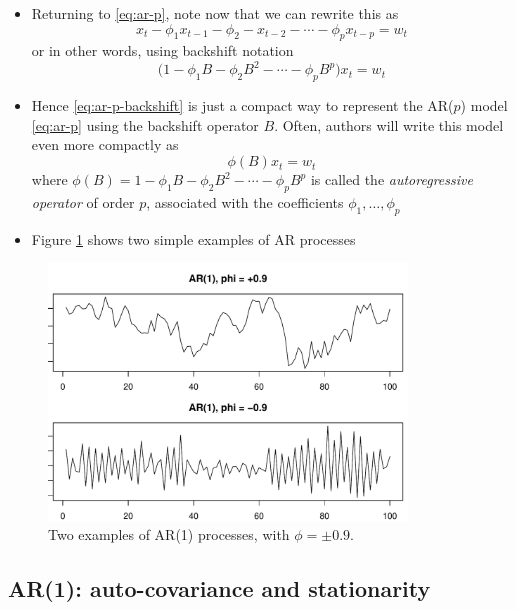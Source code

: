 \documentclass{article}
\begin{document}
\begin{itemize}
\item Returning to \eqref{eq:ar-p}, note now that we can rewrite this as 
  \[
  x_t - \phi_1 x_{t-1} - \phi_2 - x_{t-2} - \cdots - \phi_p x_{t-p} = w_t  
  \]
  or in other words, using backshift notation 
  \begin{equation}
  \label{eq:ar-p-backshift}
  \Big(1 - \phi_1 B - \phi_2 B^2 - \cdots - \phi_p B^p \Big) x_t = w_t 
  \end{equation}

\item Hence \eqref{eq:ar-p-backshift} is just a compact way to represent the
  AR($p$) model \eqref{eq:ar-p} using the backshift operator $B$. Often, authors
  will write this model even more compactly as  
  \begin{equation}
  \label{eq:ar-p-operator}
  \phi(B) x_t = w_t 
  \end{equation}
  where $\phi(B) = 1 - \phi_1 B - \phi_2 B^2 - \cdots - \phi_p B^p$ is called
  the \emph{autoregressive operator} of order $p$, associated with the
  coefficients $\phi_1,\dots,\phi_p$

\item Figure \ref{fig:ar} shows two simple examples of AR processes
\end{itemize}

\begin{figure}[htb]
\centering
\includegraphics[width=0.85\textwidth]{fig/ar-1.pdf}
\caption{Two examples of AR(1) processes, with $\phi = \pm 0.9$.}
\label{fig:ar}
\end{figure}

\subsection{AR(1): auto-covariance and stationarity}
\end{document}
